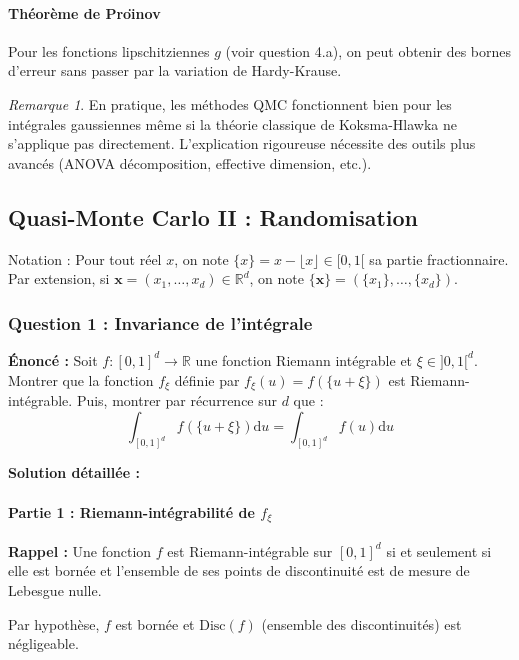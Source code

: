 \documentclass[12pt,a4paper]{article}
\theoremstyle{definition}
\theoremstyle{remark}
\newtheorem*{remark}{Remarque}
\newcommand{\R}{\mathbb{R}}
\newcommand{\dd}{\mathrm{d}}
\begin{document}
\paragraph{Théorème de Proı̈nov}

Pour les fonctions lipschitziennes $g$ (voir question 4.a), on peut obtenir des bornes d'erreur sans passer par la variation de Hardy-Krause.

\begin{remark}
En pratique, les méthodes QMC fonctionnent bien pour les intégrales gaussiennes même si la théorie classique de Koksma-Hlawka ne s'applique pas directement. L'explication rigoureuse nécessite des outils plus avancés (ANOVA décomposition, effective dimension, etc.).
\end{remark}

\subsection{Quasi-Monte Carlo II : Randomisation}

Notation : Pour tout réel $x$, on note $\{x\} = x - \lfloor x \rfloor \in [0,1[$ sa partie fractionnaire. Par extension, si $\mathbf{x} = (x_1, \ldots, x_d) \in \R^d$, on note $\{\mathbf{x}\} = (\{x_1\}, \ldots, \{x_d\})$.

\subsubsection{Question 1 : Invariance de l'intégrale}

\textbf{Énoncé :} Soit $f : [0,1]^d \to \R$ une fonction Riemann intégrable et $\xi \in ]0,1[^d$. Montrer que la fonction $f_\xi$ définie par $f_\xi(u) = f(\{u + \xi\})$ est Riemann-intégrable. Puis, montrer par récurrence sur $d$ que :
\[
\int_{[0,1]^d} f(\{u + \xi\})\dd u = \int_{[0,1]^d} f(u)\dd u
\]

\textbf{Solution détaillée :}

\paragraph{Partie 1 : Riemann-intégrabilité de $f_\xi$}

\textbf{Rappel :} Une fonction $f$ est Riemann-intégrable sur $[0,1]^d$ si et seulement si elle est bornée et l'ensemble de ses points de discontinuité est de mesure de Lebesgue nulle.

Par hypothèse, $f$ est bornée et $\text{Disc}(f)$ (ensemble des discontinuités) est négligeable.
\end{document}

